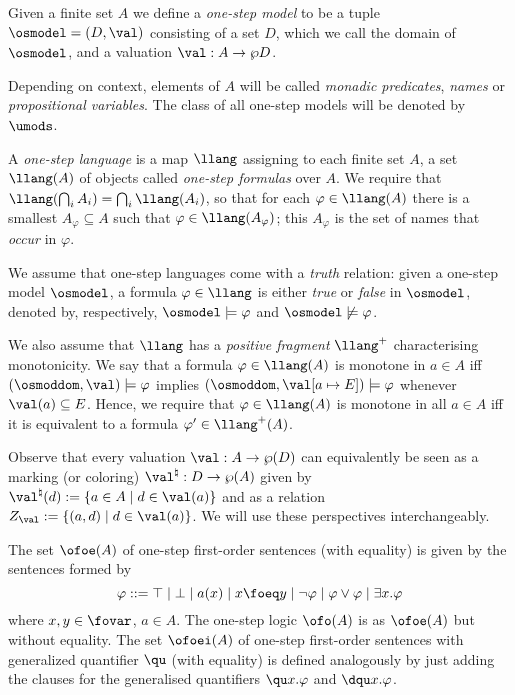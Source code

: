 
\begin{definition}
Given a finite set $A$
we define a \emph{one-step model} to be a tuple $\osmodel = (D,\val)$
consisting of a set $D$,  which we call the domain of $\osmodel$, 
and a valuation $\val: A \to \wp D$.

Depending on context, elements of $A$ will be called \emph{monadic predicates}, \emph{names}
or \emph{propositional variables}. The class of all one-step models will be denoted by $\umods$.


A \emph{one-step language} is a map $\llang$ assigning to each finite set $A$, a set $\llang(A)$ of objects called \emph{one-step formulas} over $A$.
We require that $\llang(\bigcap_{i} A_{i}) = \bigcap_{i} \llang(A_{i})$,
so that for each $\varphi \in \llang(A)$ there is a smallest $A_{\varphi} \subseteq A$ such
that $\varphi \in \llang(A_{\varphi})$; this $A_{\varphi}$ is the set of names that \emph{occur} in $\varphi$.

We assume that one-step languages come with a \emph{truth}
relation: given a one-step model $\osmodel$, a formula $\varphi \in \llang$
is either \emph{true} or \emph{false} in $\osmodel$, denoted by,
respectively, $\osmodel \models \varphi$ and $\osmodel \not\models \varphi$.
%

We also assume that $\llang$ has a \emph{positive fragment} $\llang^+$
characterising monotonicity. We say that a formula $\varphi \in \llang(A)$ is
monotone in $a\in A$ iff $(\osmoddom,\val) \models \varphi$ implies $(\osmoddom,\val[a\mapsto E]) \models \varphi$ whenever $\val(a) \subseteq E$. Hence, we require that $\varphi \in \llang(A)$ is
monotone in all $a\in A$ iff it is equivalent to a formula $\varphi' \in \llang^+(A)$.
\end{definition}


Observe that every valuation $\val: A \to \wp (D)$ can equivalently be seen as a marking (or coloring) $\val^\natural:D \to \wp(A)$ given by $\val^\natural(d) := \{a \in A \mid d \in \val(a)\}$ and as a relation $Z_\val := \{ (a,d) \mid d\in \val(a)\}$.
We will use these perspectives interchangeably.


\begin{definition}
The set $\ofoe(A)$ of one-step first-order sentences (with equality) is given by the sentences formed by
\[
\varphi ::=
\top \mid \bot 
\mid a(x)
\mid x \foeq y
\mid \neg \varphi
\mid \varphi \lor \varphi
\mid \exists x.\varphi
\]
where $x,y\in \fovar$, $a \in A$. The one-step logic $\ofo(A)$ is as $\ofoe(A)$ but without equality. 
The set $\ofoei(A)$ of one-step first-order sentences with generalized quantifier $\qu$ (with equality)
is defined analogously by just adding the clauses for the generalised quantifiers $\qu x. \varphi$ and $\dqu x. \varphi$.
\end{definition}


